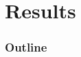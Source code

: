 \section{Results}
    \begin{frame}
    \frametitle{Outline}
    \begin{columns}[T]
        \begin{column}{.45\textwidth}
            \tableofcontents[sections=1-3,currentsection]
        \end{column}
        \begin{column}{.45\textwidth}
            \tableofcontents[sections=4-5,currentsection]
        \end{column}
    \end{columns}
    \end{frame}

